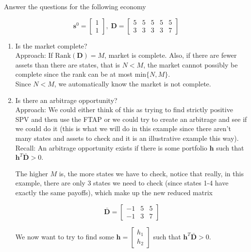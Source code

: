 \documentclass[11pt]{article}
\begin{document}
Answer the questions for the following economy

\[
\boldsymbol{s}^0 = 
\begin{bmatrix}
    1 \\ 
    1    
\end{bmatrix}, \; \boldsymbol{D} = 
\begin{bmatrix}
    5 & 5 & 5 & 5 & 5 \\
    3 & 3 & 3 & 3 & 7 
\end{bmatrix}
\]

\begin{enumerate}
    \item Is the market complete? \\ 
    Approach: If $\text{Rank}(\boldsymbol{D}) = M$, market is complete. Also, if there are
    fewer assets than there are states, that is $N < M$, the market cannot possibly be complete
    since the rank can be at most $\text{min}\{N, M\}$. \\

    Since $N<M$, we automatically know the market is not complete. 
    \item Is there an arbitrage opportunity? \\
    Approach: We could either think of this as trying to find  strictly positive SPV and then 
    use the FTAP or we could try to create an arbitrage and see if we could do it (this is 
    what we will do in this example since there aren't many states and assets to check and it 
    is an illustrative example this way). \\

    Recall: An arbitrage opportunity exists if there is some portfolio $\boldsymbol{h}$ such 
    that $\boldsymbol{h}^T \boldsymbol{\bar{D}} > 0 $. 

    The higher $M$ is, the more states we have to check, notice that really, in this example, 
    there are only 3 states we need to check (since states 1-4 have exactly the same payoffs), 
    which make up the new reduced matrix 

    \[
    \boldsymbol{\bar{D}} = 
    \begin{bmatrix}
        -1 & 5 & 5 \\
        -1 & 3 & 7 
    \end{bmatrix}    
    \]

    We now want to try to find some $\boldsymbol{h} = \begin{bmatrix} h_1 \\ h_2 \end{bmatrix}$
    such that $\boldsymbol{h}^T \boldsymbol{\bar{D}} > 0$.
    

\end{enumerate}
\end{document}
